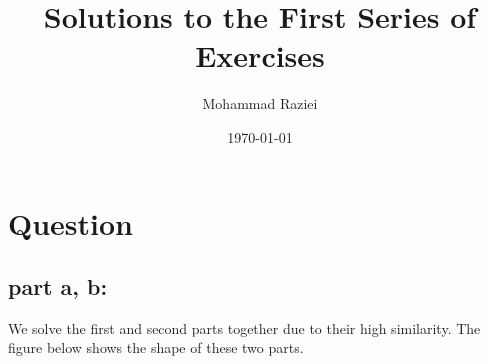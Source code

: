 \documentclass[12pt,onecolumn,a4paper]{article}
\author{Mohammad Raziei}
\title{Solutions to the First Series of Exercises}
\date{\today}
\newcommand\question{
	\section{Question \numberstringnum{\thesection}}
}
\begin{document}
	
	
	\pagestyle{fancy}
	\maketitle
	
	
	\FloatBarrier\question%
	
	
	\subsection{part a, b:}
	
	We solve the first and second parts together due to their high similarity. The figure below shows the shape of these two parts.
	
\end{document}
